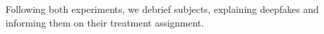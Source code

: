 Following both experiments, we debrief subjects, explaining deepfakes
and informing them on their treatment assignment.
